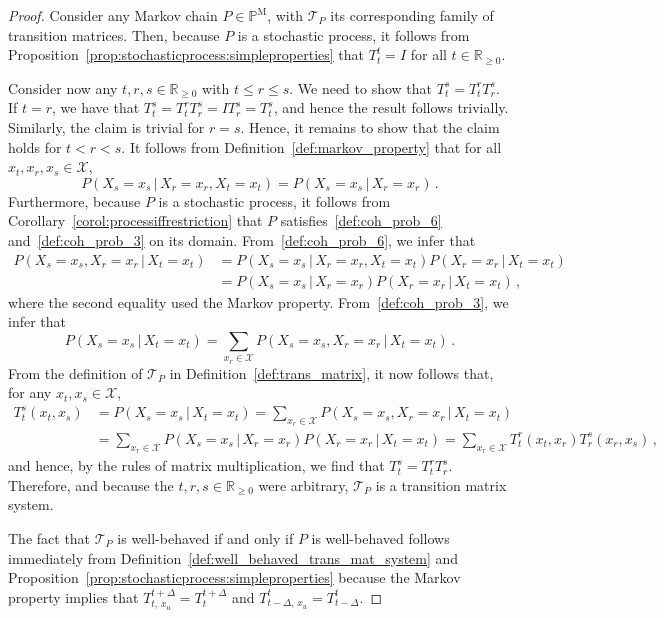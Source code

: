\documentclass[10pt,a4paper]{paper}
\theoremstyle{definition}
\newcommand{\reals}{\mathbb{R}}
\newcommand{\realsnonneg}{\reals_{\geq 0}}
\newcommand{\states}{\mathcal{X}}
\newcommand{\processes}{\mathbb{P}}
\newcommand{\mprocesses}{\processes^{\mathrm{M}}}
\begin{document}
\propMarkovhassystem*
\begin{proof}
Consider any Markov chain $P\in\mprocesses$, with $\mathcal{T}_P$ its corresponding family of transition matrices. Then, because $P$ is a stochastic process, it follows from Proposition~\ref{prop:stochasticprocess:simpleproperties} that $T_t^t=I$ for all $t\in\realsnonneg$. 

Consider now any $t,r,s\in\realsnonneg$ with $t\leq r\leq s$. We need to show that $T_t^s=T_t^rT_r^s$. If $t=r$, we have that $T_t^s=T_t^rT_r^s=IT_r^s=T_t^s$, and hence the result follows trivially. Similarly, the claim is trivial for $r=s$. Hence, it remains to show that the claim holds for $t < r < s$. It follows from Definition~\ref{def:markov_property} that for all $x_t,x_r,x_s\in\states$,
\begin{equation*}
P(X_s=x_s\,\vert\,X_r=x_r,X_t=x_t) = P(X_s=x_s\,\vert\,X_r=x_r)\,.
\end{equation*}
Furthermore, because $P$ is a stochastic process, it follows from Corollary~\ref{corol:processiffrestriction} that $P$ satisfies~\ref{def:coh_prob_6} and~\ref{def:coh_prob_3} on its domain. From~\ref{def:coh_prob_6}, we infer that
\begin{align*}
P(X_s=x_s,X_r=x_r\,\vert\,X_t=x_t) &= P(X_s=x_s\,\vert\,X_r=x_r,X_t=x_t)P(X_r=x_r\,\vert\,X_t=x_t) \\
 &= P(X_s=x_s\,\vert\,X_r=x_r)P(X_r=x_r\,\vert\,X_t=x_t)\,,
\end{align*}
where the second equality used the Markov property. From~\ref{def:coh_prob_3}, we infer that
\begin{equation*}
P(X_s=x_s\,\vert\,X_t=x_t) = \sum_{x_r\in\states} P(X_s=x_s,X_r=x_r\,\vert\,X_t=x_t)\,.
\end{equation*}
From the definition of $\mathcal{T}_P$ in Definition~\ref{def:trans_matrix}, it now follows that, for any $x_t,x_s\in\states$,
\begin{align*}
T_t^s(x_t,x_s) &= P(X_s=x_s\,\vert\,X_t=x_t) = \sum_{x_r\in\states} P(X_s=x_s,X_r=x_r\,\vert\,X_t=x_t) \\
 &= \sum_{x_r\in\states} P(X_s=x_s\,\vert\,X_r=x_r)P(X_r=x_r\,\vert\,X_t=x_t) = \sum_{x_r\in\states} T_t^r(x_t,x_r) T_r^s(x_r,x_s)\,,
\end{align*}
and hence, by the rules of matrix multiplication, we find that $T_t^s=T_t^rT_r^s$. Therefore, and because the $t,r,s\in\realsnonneg$ were arbitrary, $\mathcal{T}_P$ is a transition matrix system.

The fact that $\mathcal{T}_P$ is well-behaved if and only if $P$ is well-behaved follows immediately from Definition~\ref{def:well_behaved_trans_mat_system} and Proposition~\ref{prop:stochasticprocess:simpleproperties} because the Markov property implies that $T_{t,\,x_u}^{t+\Delta}=T_{t}^{t+\Delta}$ and $T_{t-\Delta,\,x_u}^{t}=T_{t-\Delta}^{t}$.
\end{proof}
\end{document}

